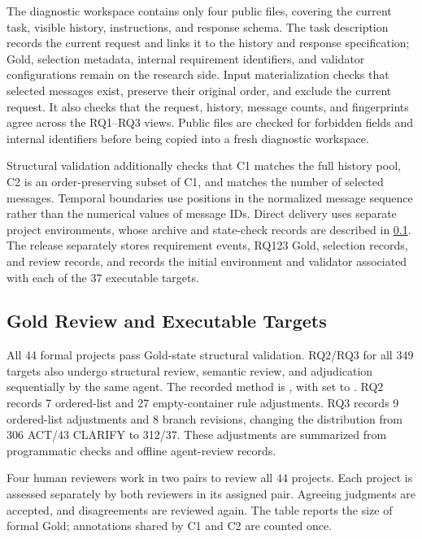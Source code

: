 \documentclass{article} %
\begin{document}
The diagnostic workspace contains only four public files, covering the current task, visible history, instructions, and response schema. The task description records the current request and links it to the history and response specification; Gold, selection metadata, internal requirement identifiers, and validator configurations remain on the research side. Input materialization checks that selected messages exist, preserve their original order, and exclude the current request. It also checks that the request, history, message counts, and fingerprints agree across the RQ1--RQ3 views. Public files are checked for forbidden fields and internal identifiers before being copied into a fresh diagnostic workspace.

Structural validation additionally checks that C1 matches the full history pool, C2 is an order-preserving subset of C1, and  matches the number of selected messages. Temporal boundaries use positions in the normalized message sequence rather than the numerical values of message IDs. Direct delivery uses separate project environments, whose archive and state-check records are described in \ref{app:b3}. The release separately stores requirement events, RQ123 Gold, selection records, and review records, and records the initial environment and validator associated with each of the 37 executable targets.

\FloatBarrier
\subsection{Gold Review and Executable Targets}
\label{app:b3}

All 44 formal projects pass Gold-state structural validation. RQ2/RQ3 for all 349 targets also undergo structural review, semantic review, and adjudication sequentially by the same agent. The recorded method is , with  set to . RQ2 records 7 ordered-list and 27 empty-container rule adjustments. RQ3 records 9 ordered-list adjustments and 8 branch revisions, changing the distribution from 306 ACT/43 CLARIFY to 312/37. These adjustments are summarized from programmatic checks and offline agent-review records.

Four human reviewers work in two pairs to review all 44 projects. Each project is assessed separately by both reviewers in its assigned pair. Agreeing judgments are accepted, and disagreements are reviewed again. The table reports the size of formal Gold; annotations shared by C1 and C2 are counted once.
\end{document}
